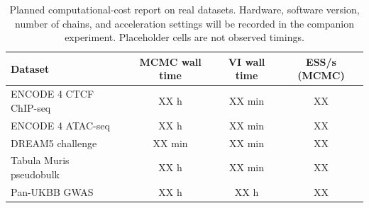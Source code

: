 \begin{table}[H]
\centering
\caption{Planned computational-cost report on real datasets. Hardware, software version, number of chains, and acceleration settings will be recorded in the companion experiment. Placeholder cells are not observed timings.}
\label{tab:real-runtime}
\small
\begin{tabularx}{\textwidth}{Yccc}
\toprule
Dataset & MCMC wall time & VI wall time & ESS/s (MCMC) \\
\midrule
ENCODE 4 CTCF ChIP-seq & XX h & XX min & XX \\
ENCODE 4 ATAC-seq & XX h & XX min & XX \\
DREAM5 challenge & XX min & XX min & XX \\
Tabula Muris pseudobulk & XX h & XX min & XX \\
Pan-UKBB GWAS & XX h & XX h & XX \\
\bottomrule
\end{tabularx}
\end{table}
